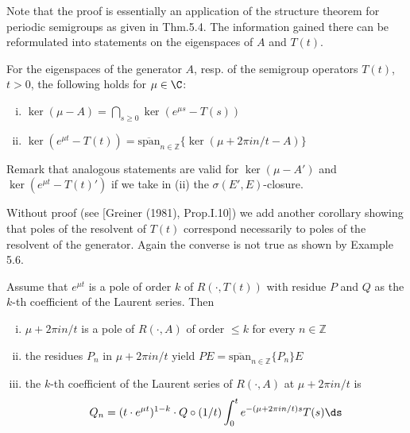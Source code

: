 Note that the proof is essentially an application of the structure theorem for periodic semigroups as given in Thm.5.4.
The information gained there can be reformulated into statements on the eigenspaces of $A$ and $T(t)$.



\newpage
\begin{corollary}\label{cor:a3-6.4}
For the eigenspaces of the generator $A$, resp. of the semigroup operators $T(t)$, $t > 0$, the following holds  for  $\mu \in \C$:

\begin{enumerate}[(i)]
\item $\ker(\mu - A) = \bigcap_{s \geq 0} \ker(e^{\mu s} - T(s))$

\item $\ker(e^{\mu t} - T(t)) = \overline{\text{span}}_{n \in \mathbb{Z}} \{\ker(\mu + 2\pi i n/t - A)\}$
\end{enumerate}
\end{corollary}

Remark that analogous statements are valid for $\ker(\mu - A')$ and $\ker(e^{\mu t} - T(t)')$ if we take in (ii) the $\sigma(E',E)$-closure.

Without proof (see [Greiner (1981), Prop.I.10]) we add another corollary showing that poles of the resolvent of $T(t)$ correspond necessarily to poles of the resolvent of the generator.
Again the converse is not true as shown by Example 5.6.

\begin{corollary}\label{cor:a3-6.5}
Assume that $e^{\mu t}$ is a pole of order $k$ of $R(\cdot,T(t))$ with residue $P$ and $Q$ as the $k$-th coefficient of the Laurent series.
Then

\begin{enumerate}[(i)]
\item $\mu + 2\pi i n/t$ is a pole of $R(\cdot,A)$ of order $\leq k$ for every $n \in \mathbb{Z}$

\item the residues $P_{n}$ in $\mu + 2\pi i n/t$ yield $PE = \overline{\text{span}}_{n \in \mathbb{Z}} \{P_{n}\}E$

\item the $k$-th coefficient of the Laurent series of $R(\cdot,A)$ at $\mu + 2\pi i n/t$ is
\[
Q_{n} = (t \cdot e^{\mu t})^{1-k} \cdot Q \circ (1/t) \int_{0}^{t} e^{-(\mu+2\pi i n/t)s}T(s) \ds
\]
\end{enumerate}
\end{corollary}

